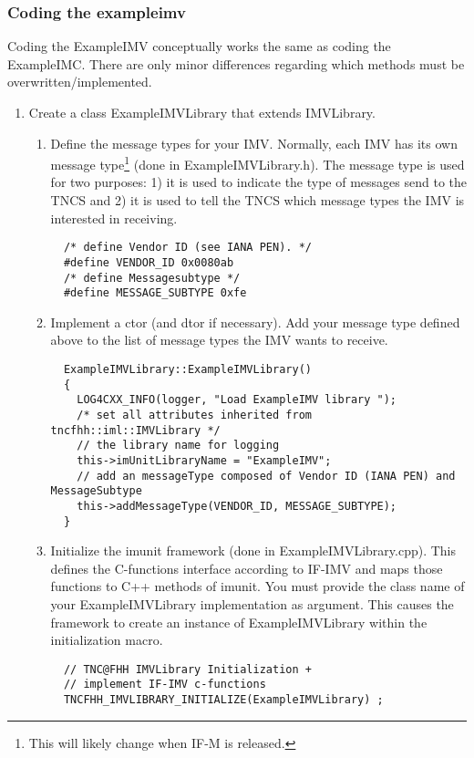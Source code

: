 \documentclass[a4paper,10pt]{scrartcl}
\begin{document}
\subsubsection{Coding the exampleimv}
Coding the ExampleIMV conceptually works the same as coding the ExampleIMC. There are only minor differences
regarding which methods must be overwritten/implemented.
\begin{enumerate}
 \item Create a class ExampleIMVLibrary that extends IMVLibrary.
 \begin{enumerate}
  \item Define the message types for your IMV. Normally, each IMV has its own message type\footnote{This
  will likely change when IF-M is released.} (done in ExampleIMVLibrary.h). The message type is used for two purposes: 1) it is used
  to indicate the type of messages send to the TNCS and 2) it is used to tell the TNCS which message types the IMV is interested in receiving.
  \begin{lstlisting}
  /* define Vendor ID (see IANA PEN). */
  #define VENDOR_ID 0x0080ab
  /* define Messagesubtype */
  #define MESSAGE_SUBTYPE 0xfe
  \end{lstlisting}

  \item Implement a ctor (and dtor if necessary).  Add your message type defined above to the list
  of message types the IMV wants to receive.
  \begin{lstlisting}
  ExampleIMVLibrary::ExampleIMVLibrary()
  {
    LOG4CXX_INFO(logger, "Load ExampleIMV library ");
    /* set all attributes inherited from tncfhh::iml::IMVLibrary */
    // the library name for logging
    this->imUnitLibraryName = "ExampleIMV";
    // add an messageType composed of Vendor ID (IANA PEN) and MessageSubtype
    this->addMessageType(VENDOR_ID, MESSAGE_SUBTYPE);
  }
  \end{lstlisting}

  \item Initialize the imunit framework (done in ExampleIMVLibrary.cpp). This defines
  the C-functions interface according to IF-IMV and maps those functions to C++ methods
  of imunit. You must provide the class name of your ExampleIMVLibrary implementation
  as argument. This causes the framework to create an instance of ExampleIMVLibrary
  within the initialization macro.
  \begin{lstlisting}
  // TNC@FHH IMVLibrary Initialization +
  // implement IF-IMV c-functions
  TNCFHH_IMVLIBRARY_INITIALIZE(ExampleIMVLibrary) ;
  \end{lstlisting}


\end{enumerate}
\end{enumerate}
\end{document}
